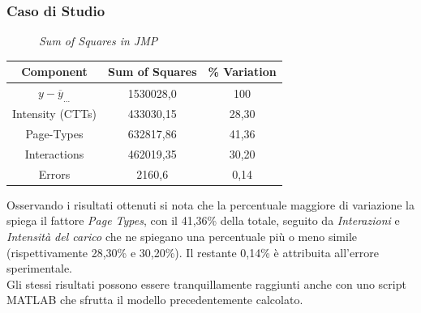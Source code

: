 \subsubsection{Caso di Studio}
\begin{figure}[H]
	\caption{\textit{Sum of Squares in JMP}}
\end{figure}
\begin{table}[h]
	\begin{center}
		\begin{tabular}{|c|c|c|}
			\hline
			Component &  Sum of Squares & \% Variation\\
			 \hline
			    $y-\overline{y}_{...}$ & 1530028,0		   & 100\\
			 \rule[-4mm]{0mm}{0.5cm}
			 Intensity (CTTs) 		   &433030,15		   & 28,30\\
			 \rule[-4mm]{0mm}{0.5cm}
			 Page-Types 		   &632817,86		   & 41,36\\
			 \rule[-4mm]{0mm}{0.5cm}
			 Interactions		   &462019,35		   & 30,20\\
			 \rule[-4mm]{0mm}{0.5cm}
			 Errors 		   &2160,6		   & 0,14\\
			\hline
		\end{tabular}
	\end{center}
\end{table}
Osservando i risultati ottenuti si nota che la percentuale maggiore di variazione la spiega il fattore \textit{Page Types}, con il 41,36\% della totale, seguito da \textit{Interazioni} e \textit{Intensità del carico} che ne spiegano una percentuale più o meno simile (rispettivamente 28,30\% e 30,20\%). Il restante 0,14\% è attribuita all'errore sperimentale.
\\Gli stessi risultati possono essere tranquillamente raggiunti anche con uno script MATLAB che sfrutta il modello precedentemente calcolato.
